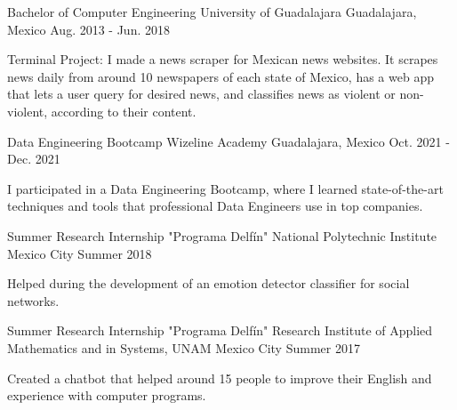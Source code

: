 

\begin{cventries}

  \cventry
    {Bachelor of Computer Engineering} %
    {University of Guadalajara} %
    {Guadalajara, Mexico} %
    {Aug. 2013 - Jun. 2018} %
    {
      \begin{cvitems} %
        \item {Terminal Project: I made a news scraper for Mexican news websites. It scrapes news daily from around 10 newspapers of each state of Mexico, has a web app that lets a user query for desired news, and classifies news as violent or non-violent, according to their content.}
      \end{cvitems}
    }

  \cventry
    {Data Engineering Bootcamp} %
    {Wizeline Academy} %
    {Guadalajara, Mexico} %
    {Oct. 2021 - Dec. 2021} %
    {
      \begin{cvitems} %
        \item {I participated in a Data Engineering Bootcamp, where I learned state-of-the-art techniques and tools that professional Data Engineers use in top companies.}
      \end{cvitems}
    }
    
  \cventry
    {Summer Research Internship "Programa Delfín"} %
    {National Polytechnic Institute} %
    {Mexico City} %
    {Summer 2018} %
    {
      \begin{cvitems} %
        \item {Helped during the development of an emotion detector classifier for social networks.}
      \end{cvitems}
    }
    
  \cventry
    {Summer Research Internship "Programa Delfín"} %
    {Research Institute of Applied Mathematics and in Systems, UNAM} %
    {Mexico City} %
    {Summer 2017} %
    {
      \begin{cvitems} %
        \item {Created a chatbot that helped around 15 people to improve their English and experience with computer programs.}
      \end{cvitems}
    }

\end{cventries}
